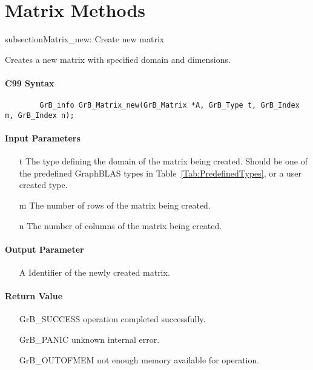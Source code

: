 \section{Matrix Methods}

subsection{{\sf Matrix\_new}: Create new matrix}

Creates a new matrix with specified domain and dimensions.

\paragraph{C99 Syntax}

\begin{verbatim}
        GrB_info GrB_Matrix_new(GrB_Matrix *A, GrB_Type t, GrB_Index m, GrB_Index n);
\end{verbatim}

\paragraph{Input Parameters}

\begin{itemize}[leftmargin=1.1in]
    \item[{\sf t}] The type defining the domain of the matrix being created. Should be one of the predefined
    GraphBLAS types in Table~\ref{Tab:PredefinedTypes}, or a user created type.
    \item[{\sf m}] The number of rows of the matrix being created.
    \item[{\sf n}] The number of columns of the matrix being created.
\end{itemize}

\paragraph{Output Parameter}

\begin{itemize}[leftmargin=1.1in]
    \item[{\sf A}] Identifier of the newly created matrix.
\end{itemize}

\paragraph{Return Value}

\begin{itemize}[leftmargin=2.1in]
\item[{\sf GrB\_SUCCESS}]   operation completed successfully.
\item[{\sf GrB\_PANIC}]     unknown internal error.
\item[{\sf GrB\_OUTOFMEM}]  not enough memory available for operation.
\end{itemize}

